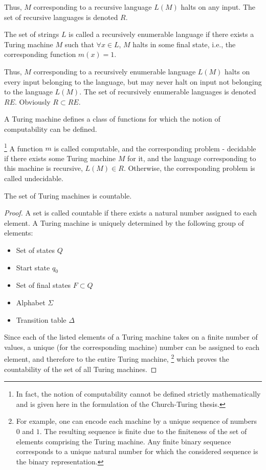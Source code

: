 Thus, $M$ corresponding to a recursive language $L\left(M\right)$ 
halts on any input. The set of recursive languages
is denoted $R$.

\begin{definition} 
The set of strings $L$
is called a recursively enumerable language if there exists a Turing machine $M$
such that $\forall x \in L$, $M$ halts in some
final state, i.e., the corresponding function $m(x) = 1$. 
\end{definition}

Thus, $M$ corresponding to a recursively enumerable language $L\left(M\right)$ 
halts on every input belonging to the language, but may never halt on input 
not belonging to the language $L\left(M\right)$. The set of recursively enumerable languages is denoted $RE$. Obviously $R \subset RE$.

A Turing machine defines a class of functions for which the notion of computability can be defined.

\begin{definition}
\footnote{
In fact, the notion of computability cannot be defined strictly mathematically and is given here in the formulation of the Church-Turing thesis.
}
A function $m$ is called computable, and the corresponding problem -
decidable if there exists some
Turing machine $M$ for it, and the language corresponding to this machine is
recursive, $L\left(M\right) \in R$. Otherwise, the corresponding
problem is called undecidable.
\end{definition}

\begin{theorem}
The set of Turing machines is countable.
\label{theoremAddAlgoTuringCountability}
\end{theorem}

\begin{proof}
A set is called countable \cite{bShenSet2012} if there exists a natural number assigned to each element. 
A Turing machine is uniquely determined by the following group of elements:
\begin{itemize}
\item Set of states $Q$
\item Start state $q_0$
\item Set of final states $F \subset Q$
\item Alphabet $\Sigma$
\item Transition table $\Delta$
\end{itemize}

Since each of the listed elements of a Turing machine
takes on a finite number of values, a unique (for the corresponding machine) number can be assigned to each element, and therefore to the entire Turing machine,
\footnote{
For example, one can encode each machine by a unique
sequence of numbers $0$ and $1$. The resulting sequence
is finite due to the finiteness of the set of elements comprising
the Turing machine. Any finite binary sequence corresponds to a unique natural number for which
the considered sequence is the binary representation.
}
which proves the countability
of the set of all Turing machines.
\end{proof}

